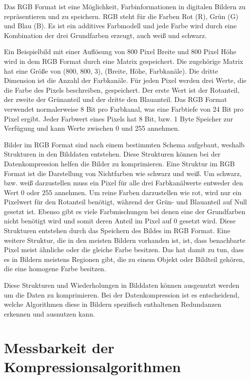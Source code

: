 \documentclass[conference]{IEEEtran}
\begin{document}
Das RGB Format ist eine Möglichkeit, Farbinformationen in digitalen Bildern zu 
repräsentieren und zu speichern. 
RGB steht für die Farben Rot (R), Grün (G) und Blau (B). 
Es ist ein additives Farbmodell und jede Farbe wird durch eine Kombination 
der drei Grundfarben erzeugt, auch weiß und schwarz. \cite{rite}

Ein Beispielbild mit einer Auflösung von 800 Pixel Breite und 800 Pixel Höhe wird in 
dem RGB Format durch eine Matrix gespeichert.
Die zugehörige Matrix hat eine Größe von (800, 800, 3), (Breite, Höhe, Farbkanäle).
Die dritte Dimension ist die Anzahl der Farbkanäle.
Für jeden Pixel werden drei Werte, die die Farbe des Pixels beschreiben, gespeichert.
Der erste Wert ist der Rotanteil, der zweite der Grünanteil und der dritte 
den Blauanteil.
Das RGB Format verwendet normalerweise 8 Bit pro Farbkanal, was eine Farbtiefe von 
24 Bit pro Pixel ergibt.
Jeder Farbwert eines Pixels hat 8 Bit, bzw. 1 Byte Speicher zur Verfügung und kann 
Werte zwischen 0 und 255 annehmen.

Bilder im RGB Format sind nach einem bestimmten Schema aufgebaut, weshalb 
Strukturen in den Bilddaten entstehen. 
Diese Strukturen können bei der Datenkompression helfen die Bilder zu komprimieren.
Eine Struktur im RGB Format ist die Darstellung von Nichtfarben 
wie schwarz und weiß. 
Um schwarz, bzw. weiß darzustellen muss ein Pixel für alle drei Farbkanälwerte entweder 
den Wert 0 oder 255 annehmen.
Um reine Farben darzustellen wie rot, wird nur ein Pixelwert für den Rotanteil 
benötigt, während der Grün- und Blauanteil auf Null gesetzt ist.
Ebenso gibt es viele Farbmischungen bei denen eine der Grundfarben nicht benötigt 
wird und somit deren Anteil im Pixel auf 0 gesetzt wird.
Diese Strukturen entstehen durch das Speichern des Bildes im RGB Format.
Eine weitere Struktur, die in den meisten Bildern vorhanden ist, ist, dass benachbarte 
Pixel meist ähnliche oder die gleiche Farbe besitzen.
Das hat damit zu tun, dass es in Bildern meistens Regionen gibt, die zu einem 
Objekt oder Bildteil gehören, die eine homogene Farbe besitzen.

Diese Strukturen und Wiederholungen in Bilddaten können ausgenutzt werden um die 
Daten zu komprimieren. 
Bei der Datenkompression ist es entscheidend, welche Algorithmen diese in Bildern
spezifisch enthaltenen Redundanzen erkennen und ausnutzen kann. 



\section{Messbarkeit der Kompressionsalgorithmen}
\end{document}
